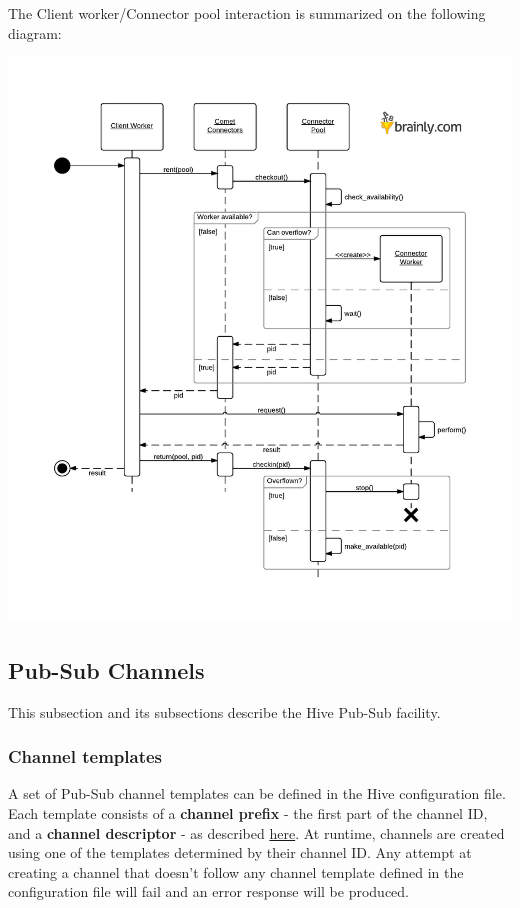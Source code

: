 \documentclass[a4paper]{article}
\begin{document}
The Client worker/Connector pool interaction is summarized on the following diagram:

\begin{center}
\includegraphics[scale=0.9]{./img/connectors.pdf}
\end{center}

\pagebreak
\subsection{Pub-Sub Channels}
\label{sec-7-3}
\label{ref-pubsub}

This subsection and its subsections describe the Hive Pub-Sub facility.
\subsubsection{Channel templates}
\label{sec-7-3-1}

A set of Pub-Sub channel templates can be defined in the Hive configuration file. Each template consists of a \textbf{channel prefix} - the first part of the channel ID, and a \textbf{channel descriptor} - as described \hyperref[ref-pubsub_config]{here}. At runtime, channels are created using one of the templates determined by their channel ID. Any attempt at creating a channel that doesn't follow any channel template defined in the configuration file will fail and an error response will be produced.
\end{document}
